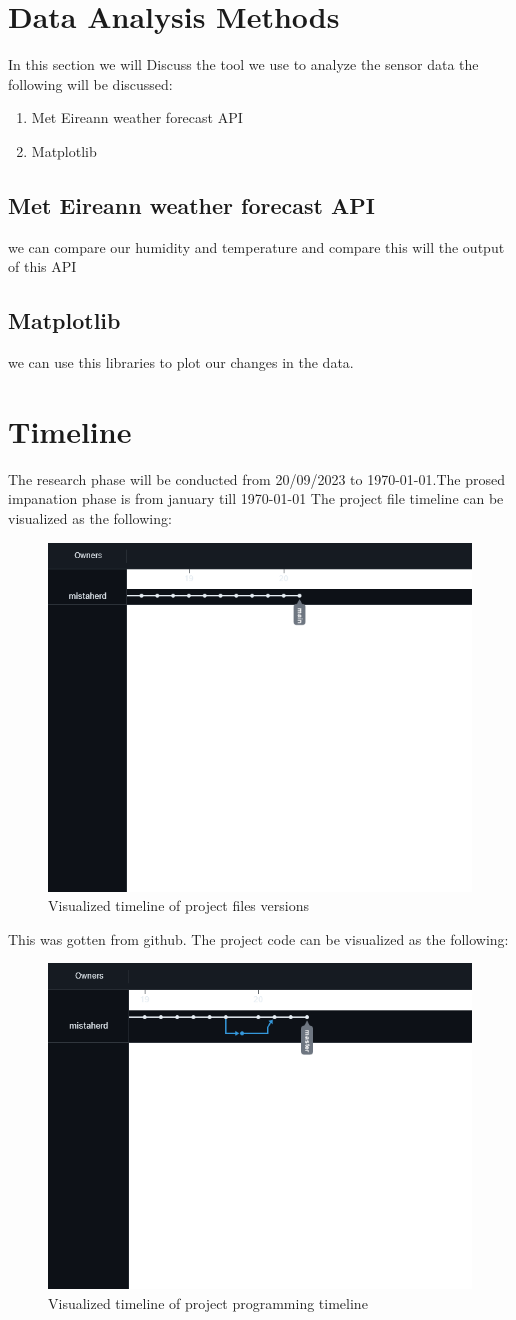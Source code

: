 \section{Data Analysis Methods}
In this section we will Discuss the tool we use to analyze the sensor data the following will be discussed:
\begin{enumerate}
    \item Met Eireann weather forecast API
    \item Matplotlib
\end{enumerate}
\subsection{Met Eireann weather forecast API}
we can compare our humidity and temperature and compare this will the output of this  API
\subsection{Matplotlib}
we can use this libraries to plot our changes in the data.


\section{Timeline}
The research  phase will be  conducted from 20/09/2023 to \today.The prosed impanation phase is from january till \today
The project file timeline can be visualized as  the following:
\begin{figure}[h!]
    \centering
    \includegraphics[width=0.5\linewidth]{Images/timeline_of_file.png}
    \caption{Visualized timeline of project files versions}
    \label{Visualized timeline of project files versions}
\end{figure}
This was gotten from github.
The  project code can be visualized as the following:
\begin{figure}[h!]
    \centering
    \includegraphics[width=0.5\linewidth]{Images/timeline_of_code.png}
    \caption{Visualized timeline of project programming timeline}
    \label{Visualized timeline of project programming timeline}
\end{figure}